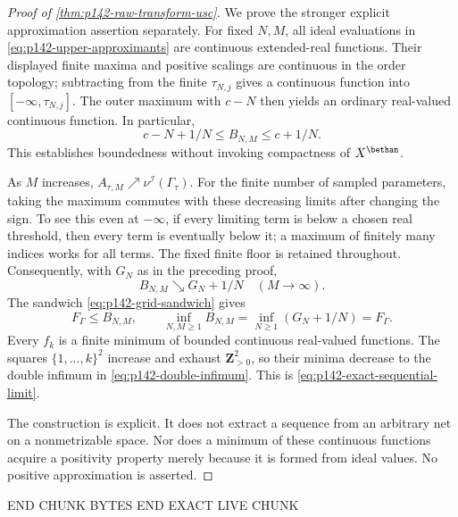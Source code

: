 \begin{proof}[Proof of \cref{thm:p142-raw-transform-usc}]
We prove the stronger explicit approximation assertion separately.
For fixed $N,M$, all ideal evaluations in
\eqref{eq:p142-upper-approximants} are continuous extended-real
functions. Their displayed finite maxima and positive scalings are
continuous in the order topology; subtracting from the finite
$\tau_{N,j}$ gives a continuous function into $[-\infty,\tau_{N,j}]$.
The outer maximum with $c-N$ then yields an ordinary real-valued
continuous function. In particular,
\[
        c-N+1/N\leq B_{N,M}\leq c+1/N.
\]
This establishes boundedness without invoking compactness of $X^{\bethan}$.

As $M$ increases, $A_{\tau,M}\nearrow\nu^{\mathcal I}(\Gamma_\tau)$.
For the finite number of sampled parameters, taking the maximum commutes
with these decreasing limits after changing the sign. To see this even
at $-\infty$, if every limiting term is below a chosen real threshold,
then every term is eventually below it; a maximum of finitely many
indices works for all terms. The fixed finite floor is retained throughout.
Consequently, with $G_N$ as in the preceding proof,
\[
           B_{N,M}\searrow G_N+1/N\quad(M\to\infty).
\]
The sandwich \eqref{eq:p142-grid-sandwich} gives
\[
 F_\Gamma\leq B_{N,M},\qquad
 \inf_{N,M\geq1}B_{N,M}
      =\inf_{N\geq1}(G_N+1/N)=F_\Gamma.
 \tag{71.33j}
 \label{eq:p142-double-infimum}
\]
Every $f_k$ is a finite minimum of bounded continuous real-valued
functions. The squares $\{1,\ldots,k\}^2$ increase and exhaust
$\mathbf Z_{>0}^2$, so their minima decrease to the double infimum
in \eqref{eq:p142-double-infimum}. This is
\eqref{eq:p142-exact-sequential-limit}.

The construction is explicit. It does not extract a sequence from an
arbitrary net on a nonmetrizable space. Nor does a minimum of these
continuous functions acquire a positivity property merely because it
is formed from ideal values. No positive approximation is asserted.
\end{proof}
END CHUNK BYTES
END EXACT LIVE CHUNK

